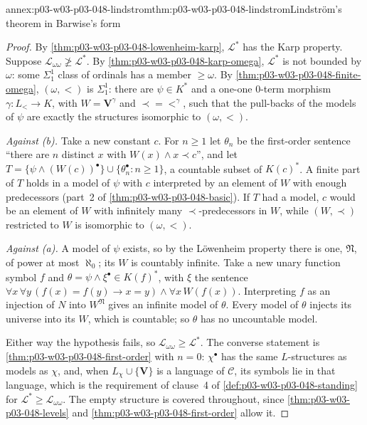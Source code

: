 \begin{annexitem}{annex:p03-w03-p03-048-lindstrom}{thm:p03-w03-p03-048-lindstrom}{Lindstr\"om's theorem in Barwise's form}
\begin{proof}
By \cref{thm:p03-w03-p03-048-lowenheim-karp}, \(\mathcal L^{\ast}\) has the
Karp property.  Suppose \(\mathcal L_{\omega\omega}\not\geq\mathcal L^{\ast}\).
By \cref{thm:p03-w03-p03-048-karp-omega}, \(\mathcal L^{\ast}\) is not
bounded by \(\omega\): some \(\Sigma^1_1\) class of ordinals has a member
\(\geq\omega\).  By \cref{thm:p03-w03-p03-048-finite-omega},
\((\omega,<)\) is \(\Sigma^1_1\): there are \(\psi\in K^{\ast}\) and a
one-one \(0\)-term morphism \(\gamma:L_{<}\to K\), with \(W=\mathbf
V^{\gamma}\) and \(\prec=<^{\gamma}\), such that the pull-backs of the models
of \(\psi\) are exactly the structures isomorphic to \((\omega,<)\).

\emph{Against (b).}  Take a new constant \(c\).  For \(n\geq1\) let
\(\theta_n\) be the first-order sentence ``there are \(n\) distinct \(x\)
with \(W(x)\land x\prec c\)'', and let
\(T=\{\psi\land(W(c))^{\bullet}\}\cup\{\theta_n^{\bullet}:n\geq1\}\), a
countable subset of \(K(c)^{\ast}\).  A finite part of \(T\) holds in a model
of \(\psi\) with \(c\) interpreted by an element of \(W\) with enough
predecessors (part~2 of \cref{thm:p03-w03-p03-048-basic}).  If \(T\) had a
model, \(c\) would be an element of \(W\) with infinitely many
\(\prec\)-predecessors in \(W\), while \((W,\prec)\) restricted to \(W\) is
isomorphic to \((\omega,<)\).

\emph{Against (a).}  A model of \(\psi\) exists, so by the L\"owenheim
property there is one, \(\mathfrak N\), of power at most \(\aleph_0\); its
\(W\) is countably infinite.  Take a new unary function symbol \(f\) and
\(\theta=\psi\land\xi^{\bullet}\in K(f)^{\ast}\), with \(\xi\) the sentence
\(\forall x\,\forall y\,(f(x)=f(y)\to x=y)\land\forall x\,W(f(x))\).
Interpreting \(f\) as an injection of \(N\) into \(W^{\mathfrak N}\) gives an
infinite model of \(\theta\).  Every model of \(\theta\) injects its universe
into its \(W\), which is countable; so \(\theta\) has no uncountable model.

Either way the hypothesis fails, so \(\mathcal L_{\omega\omega}\geq
\mathcal L^{\ast}\).  The converse statement is
\cref{thm:p03-w03-p03-048-first-order} with \(n=0\): \(\chi^{\bullet}\) has
the same \(L\)-structures as models as \(\chi\), and, when
\(L_\chi\cup\{\mathbf V\}\) is a language of \(\mathcal C\), its symbols lie
in that language, which is the requirement of clause~4 of
\cref{def:p03-w03-p03-048-standing} for \(\mathcal L^{\ast}\geq
\mathcal L_{\omega\omega}\).  The empty structure is covered throughout,
since \cref{thm:p03-w03-p03-048-levels} and
\cref{thm:p03-w03-p03-048-first-order} allow it.
\end{proof}
\end{annexitem}

